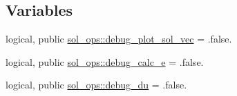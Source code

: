 \subsection*{Variables}
\begin{DoxyCompactItemize}
\item 
logical, public \hyperlink{namespacesol__ops_ae0df0d66ef4ea0155cfbeb23973c28ac}{sol\+\_\+ops\+::debug\+\_\+plot\+\_\+sol\+\_\+vec} = .false.
\item 
logical, public \hyperlink{namespacesol__ops_a4dc364bc6b70b805abdc3ed0ab2e5226}{sol\+\_\+ops\+::debug\+\_\+calc\+\_\+e} = .false.
\item 
logical, public \hyperlink{namespacesol__ops_acb6465b87495933920896a52b4298a4c}{sol\+\_\+ops\+::debug\+\_\+du} = .false.
\end{DoxyCompactItemize}
